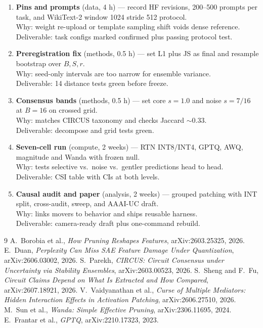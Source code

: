 \documentclass[11pt,a4paper]{article}
\makeatletter
\renewcommand\section{\@startsection{section}{1}{\z@}{-1.6ex plus -.5ex}{0.7ex plus .2ex}{\normalfont\large\bfseries}}
\makeatother
\begin{document}
\section{Future Scope}
\begin{enumerate}
\item \textbf{Pins and prompts} (data, 4 h) --- record HF revisions, 200--500 prompts per task, and WikiText-2 window 1024 stride 512 protocol. \\ Why: weight re-upload or template sampling shift voids dense reference. \\ Deliverable: task configs marked confirmed plus passing protocol test.
\item \textbf{Preregistration fix} (methods, 0.5 h) --- set L1 plus JS as final and resample bootstrap over $B,S,r$. \\ Why: seed-only intervals are too narrow for ensemble variance. \\ Deliverable: 14 distance tests green before freeze.
\item \textbf{Consensus bands} (methods, 0.5 h) --- set core $s{=}1.0$ and noise $s{=}7/16$ at $B{=}16$ on crossed grid. \\ Why: matches CIRCUS taxonomy and checks Jaccard $\sim$0.33. \\ Deliverable: decompose and grid tests green.
\item \textbf{Seven-cell run} (compute, 2 weeks) --- RTN INT8/INT4, GPTQ, AWQ, magnitude and Wanda with frozen null. \\ Why: tests selective vs.\ noise vs.\ gentler predictions head to head. \\ Deliverable: CSI table with CIs at both levels.
\item \textbf{Causal audit and paper} (analysis, 2 weeks) --- grouped patching with INT split, cross-audit, sweep, and AAAI-UC draft. \\ Why: links movers to behavior and ships reusable harness. \\ Deliverable: camera-ready draft plus one-command rebuild.
\end{enumerate}
\begin{thebibliography}{9}
\setlength{\itemsep}{0pt}\setlength{\parskip}{0pt}
 A.~Borobia et al., \textit{How Pruning Reshapes Features}, arXiv:2603.25325, 2026.
 E.~Duan, \textit{Perplexity Can Miss SAE Feature Damage Under Quantization}, arXiv:2606.03002, 2026.
 S.~Parekh, \textit{CIRCUS: Circuit Consensus under Uncertainty via Stability Ensembles}, arXiv:2603.00523, 2026.
 S.~Sheng and F.~Fu, \textit{Circuit Claims Depend on What Is Extracted and How Compared}, arXiv:2607.18921, 2026.
 V.~Vaidyanathan et al., \textit{Curse of Multiple Mediators: Hidden Interaction Effects in Activation Patching}, arXiv:2606.27510, 2026.
 M.~Sun et al., \textit{Wanda: Simple Effective Pruning}, arXiv:2306.11695, 2024.
 E.~Frantar et al., \textit{GPTQ}, arXiv:2210.17323, 2023.
\end{thebibliography}
\end{document}
